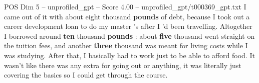 \begin{textsample}{POS Dim 5 – unprofiled\_gpt – Score 4.00 – unprofiled\_gpt/t000369\_gpt.txt}  \label{ex:f5_pos_038}
I came out of it with about eight thousand \textbf{pounds} of debt, because I took out a career development loan to do my master ’s after I ’d been travelling.
Altogether I borrowed around \textbf{ten} thousand \textbf{pounds} : about \textbf{five} thousand went straight on the tuition fees, and another \textbf{three} thousand was meant for living costs while I was studying.
After that, I basically had to work just to be able to afford food.
It wasn't like there was any extra for going out or anything, it was literally just covering the basics so I could get through the course.

\end{textsample}
